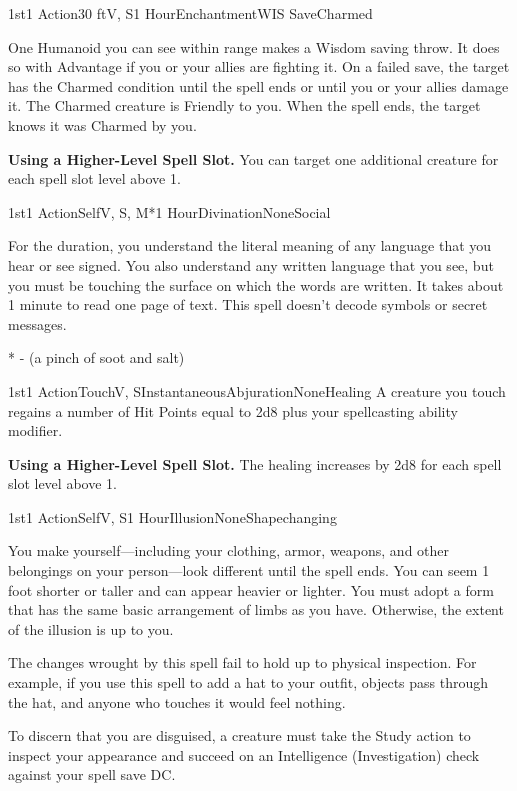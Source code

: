 

\pagestyle{empty}

\begin{Spell}{1st}{1 Action}{30 ft}{V, S}{1 Hour}{Enchantment}{WIS Save}{Charmed}

One Humanoid you can see within range makes a Wisdom saving throw. It does so with Advantage if you or your allies are fighting it. On a failed save, the target has the Charmed condition until the spell ends or until you or your allies damage it. The Charmed creature is Friendly to you. When the spell ends, the target knows it was Charmed by you.

\textbf{Using a Higher-Level Spell Slot.} You can target one additional creature for each spell slot level above 1.

\end{Spell}

\begin{Spell}{1st}{1 Action}{Self}{V, S, M*}{1 Hour}{Divination}{None}{Social}

For the duration, you understand the literal meaning of any language that you hear or see signed. You also understand any written language that you see, but you must be touching the surface on which the words are written. It takes about 1 minute to read one page of text. This spell doesn’t decode symbols or secret messages.

* - (a pinch of soot and salt)
\end{Spell}


\begin{Spell}{1st}{1 Action}{Touch}{V, S}{Instantaneous}{Abjuration}{None}{Healing}
A creature you touch regains a number of Hit Points equal to 2d8 plus your spellcasting ability modifier.

\textbf{Using a Higher-Level Spell Slot.} The healing increases by 2d8 for each spell slot level above 1.
\end{Spell}

\begin{Spell}{1st}{1 Action}{Self}{V, S}{1 Hour}{Illusion}{None}{Shapechanging}

You make yourself—including your clothing, armor, weapons, and other belongings on your person—look different until the spell ends. You can seem 1 foot shorter or taller and can appear heavier or lighter. You must adopt a form that has the same basic arrangement of limbs as you have. Otherwise, the extent of the illusion is up to you.

The changes wrought by this spell fail to hold up to physical inspection. For example, if you use this spell to add a hat to your outfit, objects pass through the hat, and anyone who touches it would feel nothing.

To discern that you are disguised, a creature must take the Study action to inspect your appearance and succeed on an Intelligence (Investigation) check against your spell save DC.
\end{Spell}

